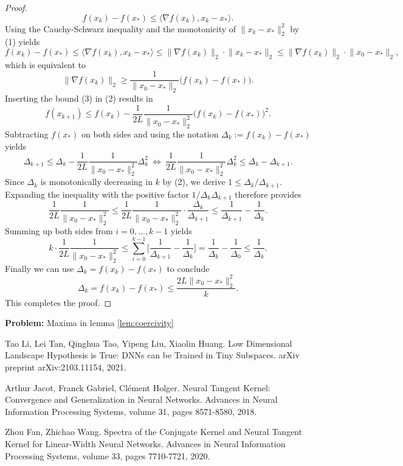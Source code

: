 \documentclass[11pt, a4paper]{article}
\begin{document}
\begin{proof}
\[ f(x_k) - f(x_*) \leq \big \langle \nabla f(x_k), x_k - x_* \big \rangle. \]
Using the Cauchy-Schwarz inequality and the monotonicity of $\big \| x_{k} - x_* \big \|_2^2$ by (1) yields
\[ f(x_k) - f(x_*) \leq \big \langle \nabla f(x_k), x_k - x_* \big \rangle  \leq \big \| \nabla f(x_k) \big \|_2 \cdot \big \| x_k - x_* \big \|_2 \leq \big \| \nabla f(x_k) \big \|_2 \cdot \big \| x_0 - x_* \big \|_2, \]
which is equivalent to
\begin{equation} \big \| \nabla f(x_k) \big \|_2 \geq \frac{1}{\big \| x_0 - x_* \big \|_2} \big ( f(x_k) - f(x_*) \big ). \end{equation}
Inserting the bound (3) in (2) results in 
\[ f(x_{k+1}) \leq f(x_k) - \frac{1}{2L} \frac{1}{\big \| x_0 - x_* \big \|_2^2} \big ( f(x_k) - f(x_*) \big )^2. \]
Subtracting $f(x_*)$ on both sides and using the notation $\Delta_k := f(x_k) - f(x_*)$ yields
\[ \Delta_{k+1} \leq \Delta_{k} - \frac{1}{2L} \frac{1}{\big \| x_0 - x_* \big \|_2^2} \Delta_k^2 \ \Leftrightarrow \ \frac{1}{2L} \frac{1}{\big \| x_0 - x_* \big \|_2^2} \Delta_k^2 \leq \Delta_k - \Delta_{k+1}. \]
Since $\Delta_k$ is monotonically decreasing in $k$ by (2), we derive $1 \leq \Delta_k / \Delta_{k+1} $. Expanding the inequality with the positive factor $1/ \Delta_k \Delta_{k+1}$ therefore provides
\[ \frac{1}{2L} \frac{1}{\big \| x_0 - x_* \big \|_2^2} \leq \frac{1}{2L} \frac{1}{\big \| x_0 - x_* \big \|_2^2} \cdot \frac{\Delta_k}{\Delta_{k+1}} \leq  \frac{1}{\Delta_{k+1}} - \frac{1}{\Delta_k}. \]
Summing up both sides from $i=0, \dots, k-1$ yields
\[ k \cdot \frac{1}{2L} \frac{1}{\big \| x_0 - x_* \big \|_2^2} \leq \sum_{i=0}^{k-1} \bigg [ \frac{1}{\Delta_{k+1}} - \frac{1}{\Delta_k} \bigg ] = \frac{1}{\Delta_{k}} - \frac{1}{\Delta_0} \leq \frac{1}{\Delta_{k}}. \]
Finally we can use $\Delta_k = f(x_k) - f(x_*)$ to conclude
\[ \Delta_k = f(x_k) - f(x_*) \leq \frac{2L \big \| x_0 - x_* \big \|_2^2 }{k}. \]
This completes the proof.
\end{proof}

\textbf{Problem:} Maxima in lemma \ref{lem:coercivity}

\pagebreak
\begin{thebibliography}{999}

 Tao Li, Lei Tan, Qinghua Tao, Yipeng Liu, Xiaolin Huang. Low Dimensional Landscape Hypothesis is True: DNNs can be Trained in Tiny Subspaces. arXiv preprint arXiv:2103.11154, 2021.

 Arthur Jacot, Franck Gabriel, Cl\'{e}ment Holger. Neural Tangent Kernel: Convergence and Generalization in Neural Networks. Advances in Neural Information Processing Systems, volume 31, pages 8571-8580, 2018.

 Zhou Fan, Zhichao Wang. Spectra of the Conjugate Kernel and Neural Tangent Kernel for Linear-Width Neural Networks. Advances in Neural Information Processing Systems, volume 33, pages 7710-7721, 2020.

\end{thebibliography}
\end{document}
